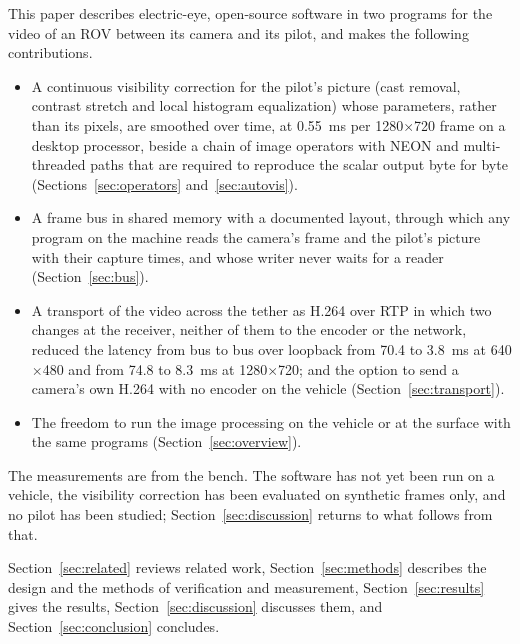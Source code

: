 This paper describes electric-eye, open-source software in two programs for the
video of an ROV between its camera and its pilot, and makes the following
contributions.
\begin{itemize}
  \item A continuous visibility correction for the pilot's picture
    (cast removal,
    contrast stretch and local histogram equalization) whose
    parameters, rather than
    its pixels, are smoothed over time, at 0.55~ms per
    1280$\times$720 frame on a
    desktop processor, beside a chain of image operators with NEON and
    multi-threaded paths that are required to reproduce the scalar
    output byte for
    byte (Sections~\ref{sec:operators} and~\ref{sec:autovis}).
  \item A frame bus in shared memory with a documented layout, through which any
    program on the machine reads the camera's frame and the pilot's picture with
    their capture times, and whose writer never waits for a reader
    (Section~\ref{sec:bus}).
  \item A transport of the video across the tether as H.264 over RTP
    in which two
    changes at the receiver, neither of them to the encoder or the
    network, reduced
    the latency from bus to bus over loopback from 70.4 to 3.8~ms at
    640$\times$480
    and from 74.8 to 8.3~ms at 1280$\times$720; and the option to
    send a camera's
    own H.264 with no encoder on the vehicle (Section~\ref{sec:transport}).
  \item The freedom to run the image processing on the vehicle or at the surface
    with the same programs (Section~\ref{sec:overview}).
\end{itemize}
The measurements are from the bench. The software has not yet been
run on a vehicle,
the visibility correction has been evaluated on synthetic frames
only, and no pilot
has been studied; Section~\ref{sec:discussion} returns to what
follows from that.

Section~\ref{sec:related} reviews related work,
Section~\ref{sec:methods} describes
the design and the methods of verification and measurement,
Section~\ref{sec:results} gives the results,
Section~\ref{sec:discussion} discusses
them, and Section~\ref{sec:conclusion} concludes.
